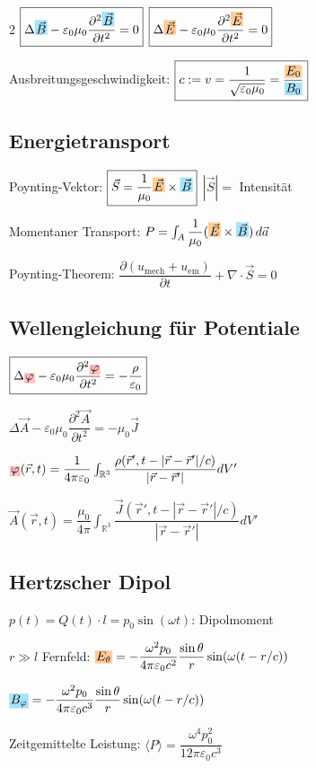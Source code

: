 \documentclass[10pt,a4paper]{article}
\newcommand{\efc}[1]{{\setlength\fboxsep{1pt}\colorbox{orange!40}{\ensuremath{#1}}}}
\newcommand{\bfc}[1]{{\setlength\fboxsep{1pt}\colorbox{cyan!35}{\ensuremath{#1}}}}
\newcommand{\vc}[1]{{\setlength\fboxsep{1pt}\colorbox{red!25}{\ensuremath{#1}}}}
\begin{document}
\begin{multicols}{2}
$\boxed{\Delta\bfc{\vec{B}}-\varepsilon_0\mu_0\dfrac{\partial^2\bfc{\vec{B}}}{\partial t^2}=0}$ \quad $\boxed{\Delta\efc{\vec{E}}-\varepsilon_0\mu_0\dfrac{\partial^2\efc{\vec{E}}}{\partial t^2}=0}$

Ausbreitungsgeschwindigkeit: $\boxed{c:=v=\dfrac{1}{\sqrt{\varepsilon_0\mu_0}}=\dfrac{\efc{E_0}}{\bfc{B_0}}}$

\subsection{Energietransport}

Poynting-Vektor: $\boxed{\vec{S}=\dfrac{1}{\mu_0}\efc{\vec{E}}\times\bfc{\vec{B}}}$ \quad $|\vec{S}|=$ Intensität

Momentaner Transport: $P=\int_A\dfrac{1}{\mu_0}(\efc{\vec{E}}\times\bfc{\vec{B}})\,d\vec{a}$

Poynting-Theorem: $\boxed{\dfrac{\partial(u_{\text{mech}}+u_{\text{em}})}{\partial t}+\nabla\cdot\vec{S}=0}$

\subsection{Wellengleichung für Potentiale}

$\boxed{\Delta\vc{\varphi}-\varepsilon_0\mu_0\dfrac{\partial^2\vc{\varphi}}{\partial t^2}=-\dfrac{\rho}{\varepsilon_0}}$

$\boxed{\Delta\vec{A}-\varepsilon_0\mu_0\dfrac{\partial^2\vec{A}}{\partial t^2}=-\mu_0\vec{J}}$

$\vc{\varphi}(\vec{r},t)=\dfrac{1}{4\pi\varepsilon_0}\int_{\mathbb{R}^3}\dfrac{\rho(\vec{r}',t-|\vec{r}-\vec{r}'|/c)}{|\vec{r}-\vec{r}'|}dV'$

$\vec{A}(\vec{r},t)=\dfrac{\mu_0}{4\pi}\int_{\mathbb{R}^3}\dfrac{\vec{J}(\vec{r}',t-|\vec{r}-\vec{r}'|/c)}{|\vec{r}-\vec{r}'|}dV'$

\subsection{Hertzscher Dipol}

$p(t)=Q(t)\cdot l=p_0\sin(\omega t)$: Dipolmoment

$r\gg l$ Fernfeld:
$\efc{E_\theta}=-\dfrac{\omega^2 p_0}{4\pi\varepsilon_0 c^2}\dfrac{\sin\theta}{r}\sin(\omega(t-r/c))$

$\bfc{B_\varphi}=-\dfrac{\omega^2 p_0}{4\pi\varepsilon_0 c^3}\dfrac{\sin\theta}{r}\sin(\omega(t-r/c))$

Zeitgemittelte Leistung: $\langle P\rangle=\dfrac{\omega^4 p_0^2}{12\pi\varepsilon_0 c^3}$


\end{multicols}
\end{document}
